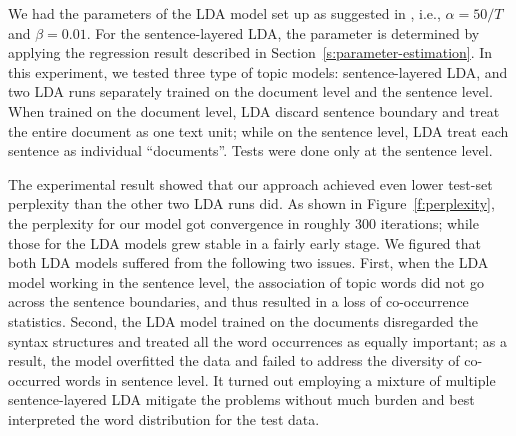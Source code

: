 We had the parameters of the LDA model set up as suggested in
\cite{griffiths2004finding}, i.e., $\alpha = 50 / T$ and $\beta = 0.01$.  For
the sentence-layered LDA, the parameter is determined by applying the
regression result described in Section~\ref{s:parameter-estimation}.  In this
experiment, we tested three type of topic models: sentence-layered LDA, and two
LDA runs separately trained on the document level and the sentence level.  When
trained on the document level, LDA discard sentence boundary and treat the
entire document as one text unit; while on the sentence level, LDA treat each
sentence as individual ``documents''.  Tests were done only at the sentence
level.  

The experimental result showed that our approach achieved even lower test-set
perplexity than the other two LDA runs did.  As shown in
Figure~\ref{f:perplexity}, the perplexity for our model got convergence in
roughly 300 iterations; while those for the LDA models grew stable in a fairly
early stage.  We figured that both LDA models suffered from the following two
issues.  First, when the LDA model working in the sentence level, the
association of topic words did not go across the sentence boundaries, and thus
resulted in a loss of co-occurrence statistics.  Second, the LDA model trained
on the documents disregarded the syntax structures and treated all the word
occurrences as equally important; as a result, the model overfitted the data
and failed to address the diversity of co-occurred words in sentence level.  It
turned out employing a mixture of multiple sentence-layered LDA mitigate the
problems without much burden and best interpreted the word distribution for the
test data.

